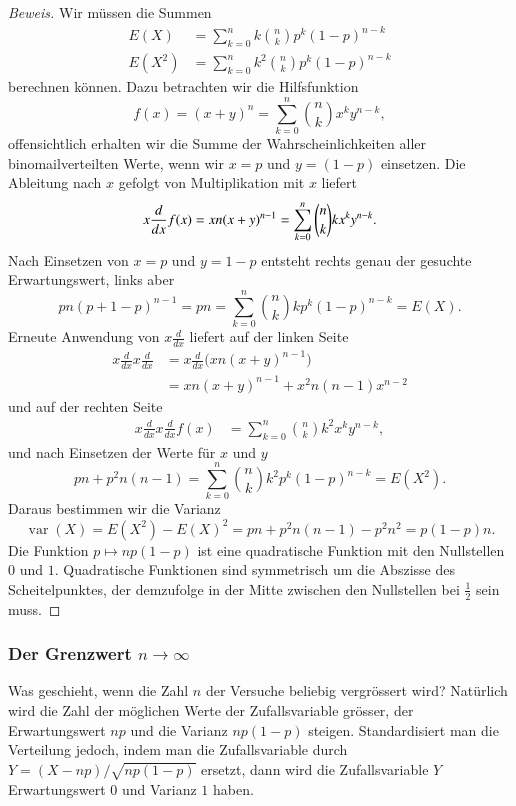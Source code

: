\begin{proof}[Beweis] Wir müssen die Summen
\begin{align*}
E(X)&=\sum_{k=0}^nk\binom{n}{k}p^k(1-p)^{n-k}\\
E(X^2)&=\sum_{k=0}^nk^2\binom{n}{k}p^k(1-p)^{n-k}
\end{align*}
berechnen können.
Dazu betrachten wir die Hilfsfunktion
\[
f(x)=(x+y)^n=\sum_{k=0}^n\binom{n}{k}x^ky^{n-k},
\]
offensichtlich erhalten wir die Summe der Wahrscheinlichkeiten aller
binomailverteilten Werte, wenn
wir $x=p$ und $y=(1-p)$ einsetzen.
Die Ableitung nach $x$ gefolgt von Multiplikation mit $x$ liefert
\[
 x\frac{d}{dx}f(x)
=xn(x+y)^{n-1}\\
=\sum_{k=0}^n\binom{n}{k}kx^ky^{n-k}.
\]
Nach Einsetzen von $x=p$ und $y=1-p$ entsteht rechts genau
der gesuchte Erwartungswert, links aber
\[
pn(p+1-p)^{n-1}=pn=\sum_{k=0}^n\binom{n}{k}kp^k(1-p)^{n-k}=E(X).
\]
Erneute Anwendung von $x\frac{d}{dx}$ liefert auf der linken Seite
\begin{align*}
x\frac{d}{dx}x\frac{d}{dx}
&=
x\frac{d}{dx}\bigl(xn(x+y)^{n-1}\bigr)
\\
&=
xn(x+y)^{n-1}+x^2 n(n-1)x^{n-2}
\end{align*}
und auf der rechten Seite
\begin{align*}
x\frac{d}{dx} x\frac{d}{dx} f(x)
&=\sum_{k=0}^n\binom{n}{k}k^2x^ky^{n-k},
\end{align*}
und nach Einsetzen der Werte für $x$ und $y$
\[
pn+p^2n(n-1)=\sum_{k=0}^n\binom{n}{k}k^2p^k(1-p)^{n-k}=E(X^2).
\]
Daraus bestimmen wir die Varianz
\[
\operatorname{var}(X)=E(X^2)-E(X)^2=pn+p^2n(n-1)-p^2n^2=p(1-p)n.
\]
Die Funktion $p\mapsto np(1-p)$ ist eine quadratische Funktion mit den
Nullstellen $0$ und $1$.
Quadratische Funktionen sind symmetrisch um
die Abszisse des Scheitelpunktes, der demzufolge in der Mitte zwischen
den Nullstellen bei $\frac12$ sein muss.
\end{proof}

\subsubsection{Der Grenzwert \texorpdfstring{$n\to\infty$}{n gegen unendlich}}
Was geschieht, wenn die Zahl $n$ der Versuche beliebig vergrössert wird?
Natürlich wird die Zahl der möglichen Werte der Zufallsvariable
grösser, der Erwartungswert $np$ und die Varianz $np(1-p)$ steigen.
Standardisiert man die Verteilung jedoch, indem man die Zufallsvariable
durch $Y=(X-np)/\sqrt{np(1-p)}$ ersetzt, dann wird die Zufallsvariable $Y$
Erwartungswert $0$ und Varianz $1$ haben. 


